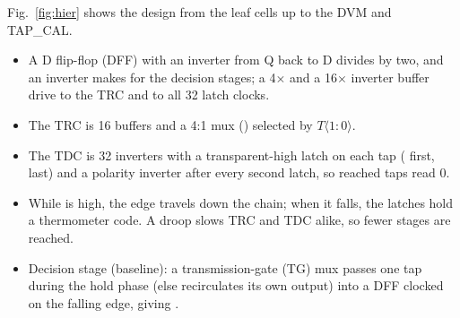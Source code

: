 \documentclass[conference]{IEEEtran}
\begin{document}
Fig.~\ref{fig:hier} shows the design from the leaf cells up to the DVM and TAP\_CAL.
\begin{itemize}
\item A D flip-flop (DFF) with an inverter from Q back to D divides  by two, and an inverter makes  for the decision stages; a 4$\times$ and a 16$\times$ inverter buffer drive  to the TRC and to all 32 latch clocks.
\item The TRC is 16 buffers and a 4:1 mux () selected by $T\langle1{:}0\rangle$.
\item The TDC is 32 inverters with a transparent-high latch on each tap ( first,  last) and a polarity inverter after every second latch, so reached taps read 0.
\item While  is high, the edge travels down the chain; when it falls, the latches hold a thermometer code. A droop slows TRC and TDC alike, so fewer stages are reached.
\item Decision stage (baseline): a transmission-gate (TG) mux passes one tap during the hold phase (else recirculates its own output) into a DFF clocked on the falling  edge, giving .
\end{itemize}
\end{document}
